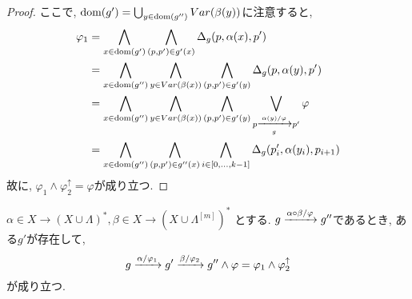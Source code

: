 \documentclass[uplatex,dvipdfmx,a4j]{jsreport}
\begin{document}
\begin{proof}
    ここで, $\dom(g') = \bigcup_{y \in \scriptsize \dom(g'')} Var(\beta(y))$に注意すると,
    \begin{align*}
      \varphi_1 &= \bigwedge_{x \in \scriptsize \dom(g')} \bigwedge_{(p, p') \in g'(x)}
                  \Delta_g(p, \alpha(x), p')  \\
                &= \bigwedge_{x \in \scriptsize \dom(g'')} \bigwedge_{y \in Var(\beta(x))}
                  \bigwedge_{(p, p') \in g'(y)} \Delta_g(p, \alpha(y), p')  \\
                &= \bigwedge_{x \in \scriptsize \dom(g'')} \bigwedge_{y \in Var(\beta(x))}
                  \bigwedge_{(p, p') \in g'(y)} \bigvee_{p \transarrow{\alpha(y) / \varphi}{g} p'}
                  \varphi  \\
                &= \bigwedge_{x \in \scriptsize \dom(g'')} \bigwedge_{(p, p') \in g''(x)}
                  \bigwedge_{i \in [0, \ldots, k - 1]} \Delta_g(p'_i, \alpha(y_i), p_{i + 1})
    \end{align*}
    故に, $\varphi_1 \land \varphi_2^\uparrow = \varphi$が成り立つ.
  \end{proof}

  \begin{lemma} \label{relation_over_g_is_associative_left}
    $\alpha \in X \rightarrow (X \cup \Lambda)^*, \beta \in X \rightarrow (X \cup \Lambda^{[m]})^*$
    とする.
    $g \transarrow{\alpha \circ \beta / \varphi}{} g''$であるとき,
    ある$g'$が存在して,
    \[
      g \transarrow{\alpha / \varphi_1}{} g' \transarrow{\beta / \varphi_2}{} g'' \land
      \varphi = \varphi_1 \land \varphi_2^\uparrow
    \]
    が成り立つ.
  \end{lemma}
\end{document}
